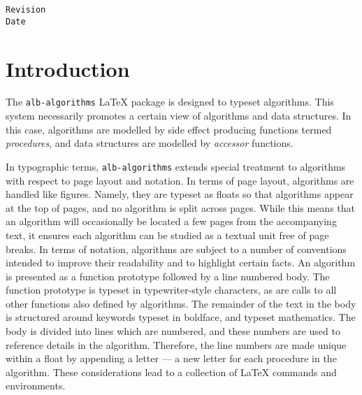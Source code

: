\documentclass[11pt,a4paper,oneside,titlepage]{alb-corp}
\begin{document}
\begin{albTitlePage}

  \verb$Revision$\\
  \verb$Date$

\end{albTitlePage}




\section{Introduction}
\label{sec:alb-algorithms-documentation:intr}

The \texttt{alb-algorithms} \LaTeX{} package is designed to typeset
algorithms.  This system necessarily promotes a certain view of
algorithms and data structures.  In this case, algorithms are modelled
by side effect producing functions termed \emph{procedures}, and data
structures are modelled by \emph{accessor} functions.

In typographic terms, \texttt{alb-algorithms} extends special treatment
to algorithms with respect to page layout and notation.  In terms of
page layout, algorithms are handled like figures.  Namely, they are
typeset as floats so that algorithms appear at the top of pages, and no
algorithm is split across pages.  While this means that an algorithm
will occasionally be located a few pages from the accompanying text, it
ensures each algorithm can be studied as a textual unit free of page
breaks.  In terms of notation, algorithms are subject to a number of
conventions intended to improve their readability and to highlight
certain facts.  An algorithm is presented as a function prototype
followed by a line numbered body.  The function prototype is typeset in
typewriter-style characters, as are calls to all other functions also
defined by algorithms.  The remainder of the text in the body is
structured around keywords typeset in boldface, and typeset mathematics.
The body is divided into lines which are numbered, and these numbers are
used to reference details in the algorithm.  Therefore, the line numbers
are made unique within a float by appending a letter --- a new letter
for each procedure in the algorithm.  These considerations lead to a
collection of \LaTeX{} commands and environments.
\end{document}

